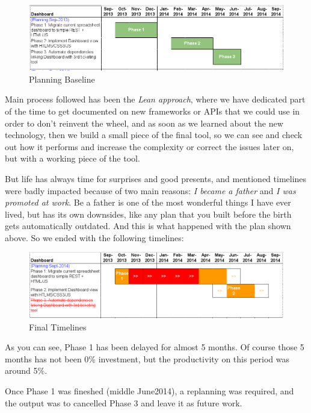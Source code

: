 \documentclass[a4paper,12pt,english]{book}
\begin{document}
\begin{figure}[ht!]
	\centering
   	\includegraphics[width=1\textwidth]{./resources/planning_baseline_12pt.png}
   	\caption{Planning Baseline}
   	\label{f_planning_baseline}
\end{figure}

Main process followed has been the \emph{Lean approach}, where we have
dedicated part of the time to get documented on new frameworks or APIs
that we could use in order to don't reinvent the wheel, and as soon as we
learned about the new technology, then we build a small piece of the final tool,
so we can see and check out how it performs and increase the complexity or
correct the issues later on, but with a working piece of the tool.

But life has always time for surprises and good presents, and mentioned
timelines were badly impacted because of two main reasons: \emph{I became a father} and
\emph{I was promoted at work}. Be a father is one of the most wonderful things
I have ever lived, but has its own downsides, like any plan that you
built before the birth gets automatically outdated. And this is what happened
with the plan shown above. So we ended with the following timelines: 

\begin{figure}[ht!]
	\centering
   	\includegraphics[width=1\textwidth]{./resources/planning_sep2014_12pt.png}
   	\caption{Final Timelines}
   	\label{f_planning_final}
\end{figure}

As you can see, Phase 1 has been delayed for almost 5 months. Of course those 5
months has not been 0\% investment, but the productivity on this period was
around 5\%.

Once Phase 1 was fineshed (middle June\/2014), a replanning was required, and
the output was to cancelled Phase 3 and leave it as future work.
\end{document}

